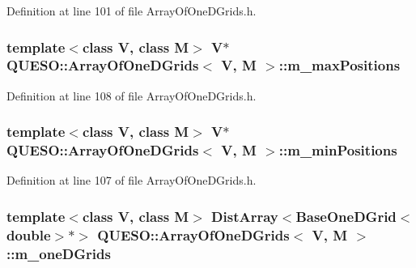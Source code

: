 Definition at line 101 of file Array\-Of\-One\-D\-Grids.\-h.

\hypertarget{class_q_u_e_s_o_1_1_array_of_one_d_grids_a8deeecb4b58f401acdc1fd101d6b5f42}{
\subsubsection[{m\-\_\-max\-Positions}]{\setlength{\rightskip}{0pt plus 5cm}template$<$class V, class M$>$ V$\ast$ {\bf Q\-U\-E\-S\-O\-::\-Array\-Of\-One\-D\-Grids}$<$ V, M $>$\-::m\-\_\-max\-Positions\hspace{0.3cm}{\ttfamily [private]}}}\label{class_q_u_e_s_o_1_1_array_of_one_d_grids_a8deeecb4b58f401acdc1fd101d6b5f42}


Definition at line 108 of file Array\-Of\-One\-D\-Grids.\-h.

\hypertarget{class_q_u_e_s_o_1_1_array_of_one_d_grids_aaca722e41b97a006385c588ea888f7d9}{
\subsubsection[{m\-\_\-min\-Positions}]{\setlength{\rightskip}{0pt plus 5cm}template$<$class V, class M$>$ V$\ast$ {\bf Q\-U\-E\-S\-O\-::\-Array\-Of\-One\-D\-Grids}$<$ V, M $>$\-::m\-\_\-min\-Positions\hspace{0.3cm}{\ttfamily [private]}}}\label{class_q_u_e_s_o_1_1_array_of_one_d_grids_aaca722e41b97a006385c588ea888f7d9}


Definition at line 107 of file Array\-Of\-One\-D\-Grids.\-h.

\hypertarget{class_q_u_e_s_o_1_1_array_of_one_d_grids_a0cdfeb23fce031448906cef8d15fd407}{
\subsubsection[{m\-\_\-one\-D\-Grids}]{\setlength{\rightskip}{0pt plus 5cm}template$<$class V, class M$>$ {\bf Dist\-Array}$<${\bf Base\-One\-D\-Grid}$<$double$>$$\ast$$>$ {\bf Q\-U\-E\-S\-O\-::\-Array\-Of\-One\-D\-Grids}$<$ V, M $>$\-::m\-\_\-one\-D\-Grids\hspace{0.3cm}{\ttfamily [private]}}}\label{class_q_u_e_s_o_1_1_array_of_one_d_grids_a0cdfeb23fce031448906cef8d15fd407}


